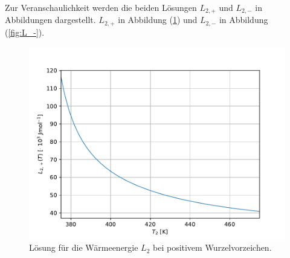     Zur Veranschaulichkeit werden die beiden Lösungen $L_{2,+}$ und $L_{2,-}$ in Abbildungen dargestellt. $L_{2,+}$ in Abbildung (\ref{fig:L_+}) und $L_{2,-}$ in Abbildung (\ref{fig:L_-}).
    \begin{figure}[H]
      \centering
      \includegraphics{plot4.pdf}
      \caption{Lösung für die Wärmeenergie $L_2$ bei positivem Wurzelvorzeichen.}
      \label{fig:L_+}
    \end{figure}

